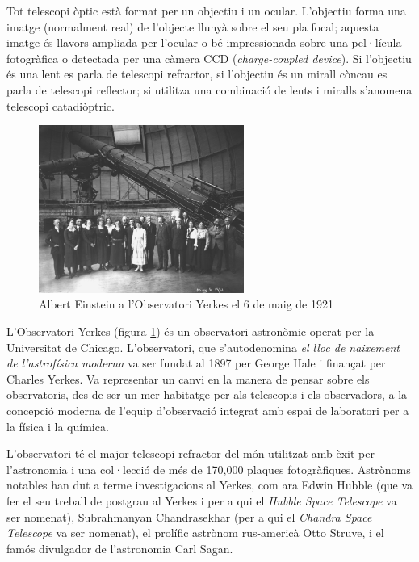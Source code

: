 Tot telescopi òptic està format per un objectiu i un ocular. L'objectiu forma una imatge (normalment real) de l'objecte llunyà sobre el seu pla focal; aquesta imatge és llavors ampliada per l'ocular o bé impressionada sobre una pel·lícula fotogràfica o detectada per una càmera CCD (\textit{charge-coupled device}). Si l'objectiu és una lent es parla de telescopi refractor, si l'objectiu és un mirall còncau es parla de telescopi reflector; si utilitza una combinació de lents i miralls s'anomena telescopi catadiòptric.
\begin{figure}[h]
	\centering
	\includegraphics[width=0.6\textwidth]{./images/1-yerkes}
	\caption{Albert Einstein a l'Observatori Yerkes el 6 de maig de 1921}
	\label{fig:yerkes}
\end{figure}

L'Observatori Yerkes (figura \ref{fig:yerkes}) és un observatori astronòmic operat per la Universitat de Chicago. L'observatori, que s'autodenomina \textit{el lloc de naixement de l'astrofísica moderna} va ser fundat al 1897 per George Hale i finançat per Charles Yerkes. Va representar un canvi en la manera de pensar sobre els observatoris, des de ser un mer habitatge per als telescopis i els observadors, a la concepció moderna de l'equip d'observació integrat amb espai de laboratori per a la física i la química.

L'observatori té el major telescopi refractor del món utilitzat amb èxit per l'astronomia i una col·lecció de més de 170,000 plaques fotogràfiques. Astrònoms notables han dut a terme investigacions al Yerkes, com ara Edwin Hubble (que va fer el seu treball de postgrau al Yerkes i per a qui el \textit{Hubble Space Telescope} va ser nomenat), Subrahmanyan Chandrasekhar (per a qui el \textit{Chandra Space Telescope} va ser nomenat), el prolífic astrònom rus-americà Otto Struve, i el famós divulgador de l'astronomia Carl Sagan.

